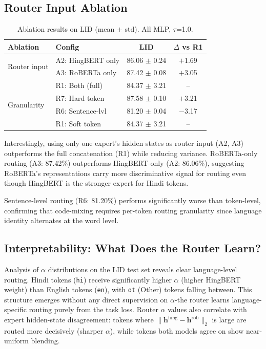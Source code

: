 \documentclass[conference]{IEEEtran}
\begin{document}
\subsection{Router Input Ablation}

\begin{table}[t]
\centering
\caption{Ablation results on LID (mean $\pm$ std). All MLP, $\tau$=1.0.}
\label{tab:ablations}
\setlength{\tabcolsep}{4pt}
\begin{tabular}{llcc}
\toprule
\textbf{Ablation} & \textbf{Config} & \textbf{LID} & \textbf{$\Delta$ vs R1} \\
\midrule
\multirow{2}{*}{Router input}
  & A2: HingBERT only & 86.06 $\pm$ 0.24 & $+$1.69 \\
  & A3: RoBERTa only  & 87.42 $\pm$ 0.08 & $+$3.05 \\
  & R1: Both (full)   & 84.37 $\pm$ 3.21 & -- \\
\midrule
\multirow{2}{*}{Granularity}
  & R7: Hard token    & 87.58 $\pm$ 0.10 & $+$3.21 \\
  & R6: Sentence-lvl  & 81.20 $\pm$ 0.04 & $-$3.17 \\
  & R1: Soft token    & 84.37 $\pm$ 3.21 & -- \\
\bottomrule
\end{tabular}
\end{table}

Interestingly, using only one expert's hidden states as router input (A2, A3) outperforms the full concatenation (R1) while reducing variance. RoBERTa-only routing (A3: 87.42\%) outperforms HingBERT-only (A2: 86.06\%), suggesting RoBERTa's representations carry more discriminative signal for routing even though HingBERT is the stronger expert for Hindi tokens.

Sentence-level routing (R6: 81.20\%) performs significantly worse than token-level, confirming that code-mixing requires per-token routing granularity since language identity alternates at the word level.

\subsection{Interpretability: What Does the Router Learn?}

Analysis of $\alpha$ distributions on the LID test set reveals clear language-level routing. Hindi tokens (\texttt{hi}) receive significantly higher $\alpha$ (higher HingBERT weight) than English tokens (\texttt{en}), with \texttt{ot} (Other) tokens falling between. This structure emerges without any direct supervision on $\alpha$-the router learns language-specific routing purely from the task loss. Router $\alpha$ values also correlate with expert hidden-state disagreement: tokens where $\|\mathbf{h}^{\text{hing}} - \mathbf{h}^{\text{rob}}\|_2$ is large are routed more decisively (sharper $\alpha$), while tokens both models agree on show near-uniform blending.
\end{document}

